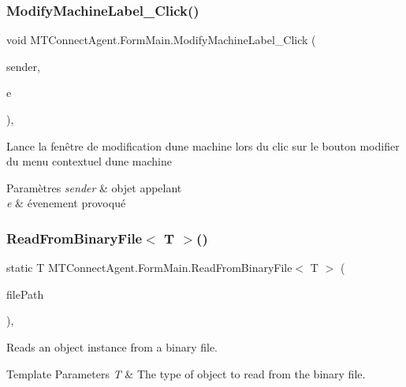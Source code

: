 \subsubsection{\texorpdfstring{Modify\+Machine\+Label\+\_\+\+Click()}{ModifyMachineLabel\_Click()}}
{\footnotesize\ttfamily void M\+T\+Connect\+Agent.\+Form\+Main.\+Modify\+Machine\+Label\+\_\+\+Click (\begin{DoxyParamCaption}\item[{object}]{sender,  }\item[{Event\+Args}]{e }\end{DoxyParamCaption})\hspace{0.3cm}{\ttfamily [inline]}, {\ttfamily [private]}}



Lance la fenêtre de modification d\textquotesingle{}une machine lors du clic sur le bouton modifier du menu contextuel d\textquotesingle{}une machine 


\begin{DoxyParams}{Paramètres}
{\em sender} & objet appelant\\
\hline
{\em e} & évenement provoqué\\
\hline
\end{DoxyParams}
\mbox{\label{class_m_t_connect_agent_1_1_form_main_af15030e628945bf0e6af793a954560b0}} 
\subsubsection{\texorpdfstring{Read\+From\+Binary\+File$<$ T $>$()}{ReadFromBinaryFile< T >()}}
{\footnotesize\ttfamily static T M\+T\+Connect\+Agent.\+Form\+Main.\+Read\+From\+Binary\+File$<$ T $>$ (\begin{DoxyParamCaption}\item[{string}]{file\+Path }\end{DoxyParamCaption})\hspace{0.3cm}{\ttfamily [inline]}, {\ttfamily [static]}}



Reads an object instance from a binary file. 


\begin{DoxyTemplParams}{Template Parameters}
{\em T} & The type of object to read from the binary file.\\
\hline
\end{DoxyTemplParams}

